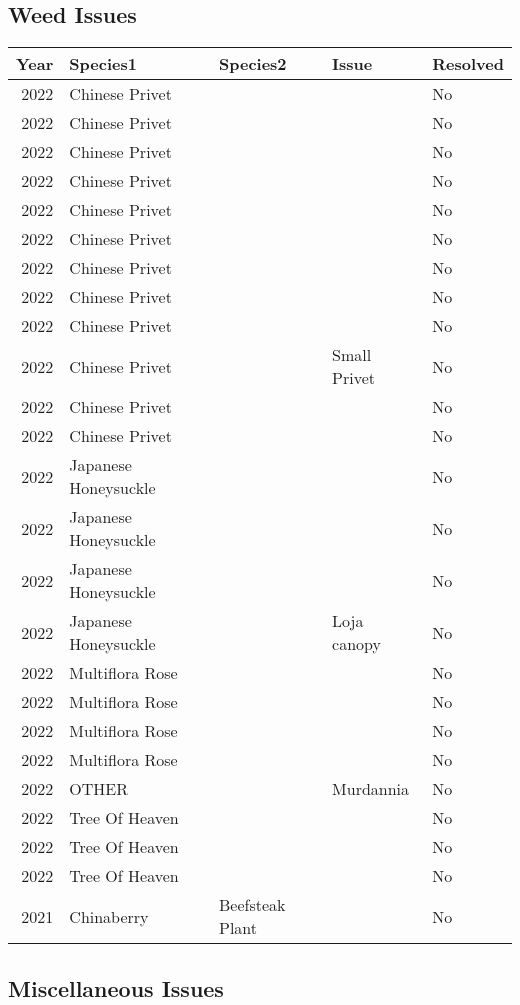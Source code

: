 \documentclass[
  landscape]{article}
\begin{document}
\newpage

\hypertarget{weed-issues}{%
\subsection{Weed Issues}\label{weed-issues}}

\begin{longtable}[]{@{}rllll@{}}
\toprule()
Year & Species1 & Species2 & Issue & Resolved \\
\midrule()
\endhead
2022 & Chinese Privet & & & No \\
2022 & Chinese Privet & & & No \\
2022 & Chinese Privet & & & No \\
2022 & Chinese Privet & & & No \\
2022 & Chinese Privet & & & No \\
2022 & Chinese Privet & & & No \\
2022 & Chinese Privet & & & No \\
2022 & Chinese Privet & & & No \\
2022 & Chinese Privet & & & No \\
2022 & Chinese Privet & & Small Privet & No \\
2022 & Chinese Privet & & & No \\
2022 & Chinese Privet & & & No \\
2022 & Japanese Honeysuckle & & & No \\
2022 & Japanese Honeysuckle & & & No \\
2022 & Japanese Honeysuckle & & & No \\
2022 & Japanese Honeysuckle & & Loja canopy & No \\
2022 & Multiflora Rose & & & No \\
2022 & Multiflora Rose & & & No \\
2022 & Multiflora Rose & & & No \\
2022 & Multiflora Rose & & & No \\
2022 & OTHER & & Murdannia & No \\
2022 & Tree Of Heaven & & & No \\
2022 & Tree Of Heaven & & & No \\
2022 & Tree Of Heaven & & & No \\
2021 & Chinaberry & Beefsteak Plant & & No \\
\bottomrule()
\end{longtable}

\hypertarget{miscellaneous-issues}{%
\subsection{Miscellaneous Issues}\label{miscellaneous-issues}}
\end{document}
